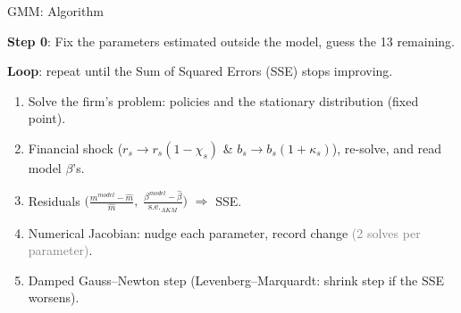 \documentclass[aspectratio=169]{beamer}
\begin{document}
 
\begin{frame}[noframenumbering]{GMM: Algorithm}\label{gmmalgo}
 
\textbf{Step 0}: Fix the parameters estimated outside the model, guess the 13 remaining.
\vspace{4mm}
 
\textbf{Loop}: repeat until the Sum of Squared Errors (SSE) stops improving.
\begin{enumerate}
    \item Solve the firm's problem: policies and the stationary distribution (fixed point).
    \item Financial shock ($r_s \to r_s(1 - \chi_s)$ \& $b_s \to b_s(1 + \kappa_s)$), re-solve, and read model $\beta$'s.
    \item Residuals $\big(\frac{m^{model} - \hat m}{\hat m},\; \frac{\beta^{model} - \hat \beta}{\mathrm{s.e.}_{AKM}}\big)$
          $\Rightarrow$ SSE.
    \item Numerical Jacobian: nudge each parameter, record change \textcolor{gray}{(2 solves per parameter)}.
    \item Damped Gauss--Newton step (Levenberg--Marquardt: shrink step if the SSE worsens).
\end{enumerate}
 
\hyperlink{minimum_distance}{}
 
\end{frame}
 
 
\end{document}
